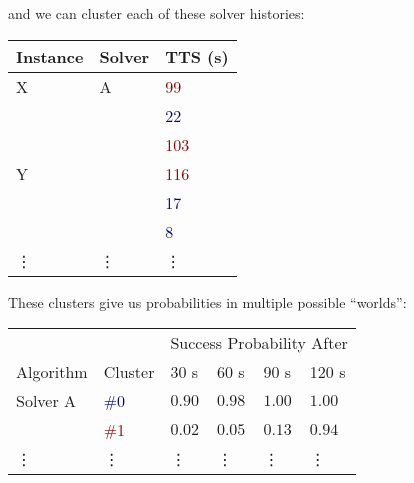 \begin{frame}
and we can cluster each of these solver histories:

\begin{center}
\begin{tabular}{lll}
\toprule
Instance & Solver & TTS (s)\\
\midrule
X & A & \textcolor{darkred}{99}\\
  &   & \textcolor{darkblue}{22}\\
  &   & \textcolor{darkred}{103}\\
Y &   & \textcolor{darkred}{116}\\
  &   & \textcolor{darkblue}{17}\\
  &   & \textcolor{darkblue}{8}\\
\vdots & \vdots & \vdots\\
\bottomrule
\end{tabular}
\end{center}
\end{frame}

\begin{frame}
These clusters give us probabilities in multiple possible ``worlds'':

\begin{center}
\begin{tabular}{llllll}
\toprule
& & \multicolumn{4}{l}{Success Probability After}\\
\cmidrule{3-6}
Algorithm & Cluster & 30 s & 60 s & 90 s & 120 s\\
\midrule
Solver A & \textcolor{darkblue}{\#0} & $0.90$ & $0.98$ & $1.00$ & $1.00$\\
& \textcolor{darkred}{\#1} & $0.02$ & $0.05$ & $0.13$ & $0.94$\\
\vdots & \vdots & \vdots & \vdots & \vdots & \vdots\\
\bottomrule
\end{tabular}
\end{center}
\end{frame}

